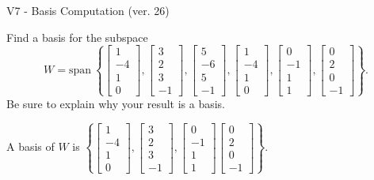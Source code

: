 \begin{exercise}
  \begin{exerciseTitle}V7 - Basis Computation (ver. 26)\end{exerciseTitle}
  \begin{exerciseStatement}
    Find a basis for the subspace 
\[W=\mathrm{span}\ \left\{\left[\begin{array}{r}
1 \\
-4 \\
1 \\
0
\end{array}\right] , \left[\begin{array}{r}
3 \\
2 \\
3 \\
-1
\end{array}\right] , \left[\begin{array}{r}
5 \\
-6 \\
5 \\
-1
\end{array}\right] , \left[\begin{array}{r}
1 \\
-4 \\
1 \\
0
\end{array}\right] , \left[\begin{array}{r}
0 \\
-1 \\
1 \\
1
\end{array}\right] , \left[\begin{array}{r}
0 \\
2 \\
0 \\
-1
\end{array}\right]\right\}.\]
 Be sure to explain why your result is a basis.


  \end{exerciseStatement}
  \begin{exerciseAnswer}
   A basis of \(W\) is  \(\left\{\left[\begin{array}{r}
1 \\
-4 \\
1 \\
0
\end{array}\right] , \left[\begin{array}{r}
3 \\
2 \\
3 \\
-1
\end{array}\right] , \left[\begin{array}{r}
0 \\
-1 \\
1 \\
1
\end{array}\right] \left[\begin{array}{r}
0 \\
2 \\
0 \\
-1
\end{array}\right]\right\}\).
  


  \end{exerciseAnswer}
\end{exercise}